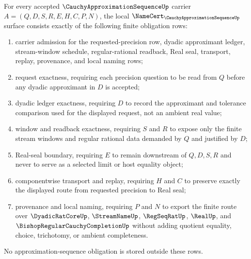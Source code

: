 \begin{theorem}\label{thm:cauchy-approximation-sequence-namecert-obligations}
For every accepted $\CauchyApproximationSequenceUp$ carrier $A=(Q,D,S,R,E,H,C,P,N)$, the local $\NameCert_{\CauchyApproximationSequenceUp}$ surface consists exactly of the following finite obligation rows:
\begin{enumerate}
\item carrier admission for the requested-precision row, dyadic approximant ledger, stream-window schedule, regular-rational readback, Real seal, transport, replay, provenance, and local naming rows;
\item request exactness, requiring each precision question to be read from $Q$ before any dyadic approximant in $D$ is accepted;
\item dyadic ledger exactness, requiring $D$ to record the approximant and tolerance comparison used for the displayed request, not an ambient real value;
\item window and readback exactness, requiring $S$ and $R$ to expose only the finite stream windows and regular rational data demanded by $Q$ and justified by $D$;
\item Real-seal boundary, requiring $E$ to remain downstream of $Q,D,S,R$ and never to serve as a selected limit or host equality object;
\item componentwise transport and replay, requiring $H$ and $C$ to preserve exactly the displayed route from requested precision to Real seal;
\item provenance and local naming, requiring $P$ and $N$ to export the finite route over $\DyadicRatCoreUp$, $\StreamNameUp$, $\RegSeqRatUp$, $\RealUp$, and $\BishopRegularCauchyCompletionUp$ without adding quotient equality, choice, trichotomy, or ambient completeness.
\end{enumerate}
No approximation-sequence obligation is stored outside these rows.
\end{theorem}
